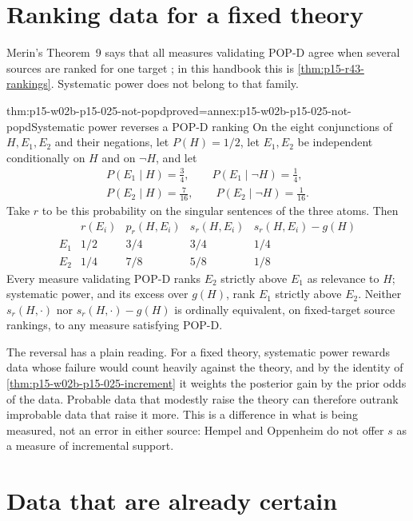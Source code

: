 \section{Ranking data for a fixed theory}
\label{sec:p15-w02b-p15-025-ranking}

Merin's Theorem~9 says that all measures validating POP-D agree when
several sources are ranked for one target
\cite[p.~271]{Merin2021Relevance}; in this handbook this is
\cref{thm:p15-r43-rankings}. Systematic power does not belong to that
family.

\begin{hbtheorem}{thm:p15-w02b-p15-025-not-popd}{proved=annex:p15-w02b-p15-025-not-popd}{Systematic power reverses a POP-D ranking}
On the eight conjunctions of \(H,E_1,E_2\) and their negations, let
\(P(H)=1/2\), let \(E_1,E_2\) be independent conditionally on \(H\) and
on \(\neg H\), and let
\[
 \begin{gathered}
 P(E_1\mid H)=\tfrac34,\qquad P(E_1\mid\neg H)=\tfrac14,\\
 P(E_2\mid H)=\tfrac7{16},\qquad P(E_2\mid\neg H)=\tfrac1{16}.
 \end{gathered}
\]
Take \(r\) to be this probability on the singular sentences of the
three atoms. Then
\[
 \begin{array}{c|cccc}
  &r(E_i)&p_r(H,E_i)&s_r(H,E_i)&s_r(H,E_i)-g(H)\\\hline
 E_1&1/2&3/4&3/4&1/4\\
 E_2&1/4&7/8&5/8&1/8
 \end{array}
\]
Every measure validating POP-D ranks \(E_2\) strictly above \(E_1\) as
relevance to \(H\); systematic power, and its excess over \(g(H)\), rank
\(E_1\) strictly above \(E_2\). Neither \(s_r(H,\cdot)\) nor
\(s_r(H,\cdot)-g(H)\) is ordinally equivalent, on fixed-target source
rankings, to any measure satisfying POP-D.
\end{hbtheorem}

The reversal has a plain reading. For a fixed theory, systematic power
rewards data whose failure would count heavily against the theory, and
by the identity of \cref{thm:p15-w02b-p15-025-increment} it weights the
posterior gain by the prior odds of the data. Probable data that
modestly raise the theory can therefore outrank improbable data that
raise it more. This is a difference in what is being measured, not an
error in either source: Hempel and Oppenheim do not offer \(s\) as a
measure of incremental support.

\section{Data that are already certain}
\label{sec:p15-w02b-p15-025-certain}

